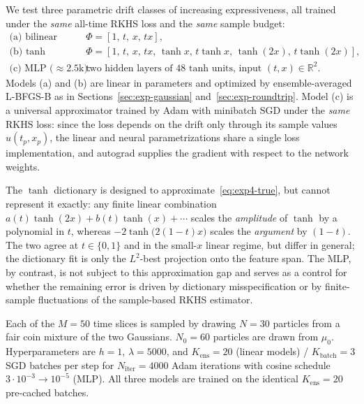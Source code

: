 \documentclass[11pt,leqno]{article}
\theoremstyle{plain}
\theoremstyle{remark}
\theoremstyle{definition}
\numberwithin{equation}{section}
\numberwithin{figure}{section}
\numberwithin{table}{section}
\begin{document}
We test three parametric drift classes of increasing expressiveness,
all trained under the \emph{same} all-time RKHS loss and the \emph{same}
sample budget:
\begin{align*}
  \text{(a) bilinear (4p):}\quad &\Phi=[1,\,t,\,x,\,tx],\\
  \text{(b) tanh dictionary (8p):}\quad
    &\Phi=[1,\,t,\,x,\,tx,\,
            \tanh x,\,t\tanh x,\,
            \tanh(2x),\,t\tanh(2x)],\\
  \text{(c) MLP ($\approx 2.5$k):}\quad &\text{two hidden layers of $48$ tanh units,
      input $(t,x)\in\mathbb R^2$.}
\end{align*}
Models (a) and (b) are linear in parameters and optimized by
ensemble-averaged L-BFGS-B as in Sections~\ref{sec:exp-gaussian}
and~\ref{sec:exp-roundtrip}.  Model (c) is a universal approximator
trained by Adam with minibatch SGD under the \emph{same} RKHS loss:
since the loss depends on the drift only through its sample values
$u(t_p,x_p)$, the linear and neural parametrizations share a single
loss implementation, and autograd supplies the gradient with respect
to the network weights.

The $\tanh$ dictionary is designed to approximate~\eqref{eq:exp4-true},
but cannot represent it exactly: any finite linear combination
$a(t)\tanh(2x)+b(t)\tanh(x)+\cdots$ scales the \emph{amplitude} of
$\tanh$ by a polynomial in $t$, whereas $-2\tanh\!\bigl(2(1-t)x\bigr)$
scales the \emph{argument} by $(1-t)$.  The two agree at $t\in\{0,1\}$
and in the small-$x$ linear regime, but differ in general; the
dictionary fit is only the $L^2$-best projection onto the feature
span.  The MLP, by contrast, is not subject to this approximation gap
and serves as a control for whether the remaining error is driven by
dictionary misspecification or by finite-sample fluctuations of the
sample-based RKHS estimator.

Each of the $M=50$ time slices is sampled by drawing $N=30$ particles
from a fair coin mixture of the two Gaussians. $N_0=60$ particles are
drawn from $\mu_0$.  Hyperparameters are $h=1$, $\lambda=5000$, and
$K_{\mathrm{ens}}=20$ (linear models) / $K_{\mathrm{batch}}=3$ SGD
batches per step for $N_{\mathrm{iter}}=4000$ Adam iterations with
cosine schedule $3{\cdot}10^{-3}\!\to\!10^{-5}$ (MLP).  All three
models are trained on the identical $K_{\mathrm{ens}}=20$ pre-cached
batches.
\end{document}
